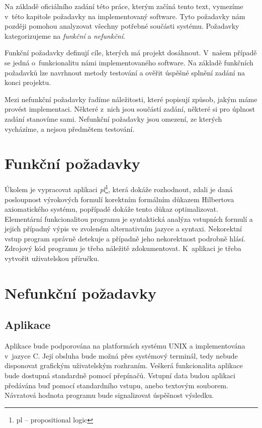 \documentclass[thesis=B,czech,hidelinks]{FITthesis}[2012/06/26]
\begin{document}
Na základě oficiálního zadání této práce, kterým začíná tento text, vymezíme v~této kapitole požadavky na implementovaný software. Tyto požadavky nám později pomohou analyzovat všechny potřebné součásti systému. Požadavky kategorizujeme na \emph{funkční} a \emph{nefunkční}.

Funkční požadavky definují cíle, kterých má projekt dosáhnout. V~našem případě se jedná o~funkcionalitu námi implementovaného software. Na základě funkčních požadavků lze navrhnout metody testování a ověřit úspěšné splnění zadání na konci projektu.

Mezi nefunkční požadavky řadíme náležitosti, které popisují způsob, jakým máme provést implementaci. Některé z~nich jsou součástí zadání, některé si pro úplnost zadání stanovíme sami. Nefunkční požadavky jsou omezení, ze kterých vycházíme, a nejsou předmětem testování.

\section{Funkční požadavky}

Úkolem je vypracovat aplikaci \emph{pl}\footnote{pl -- propositional logic}, která dokáže rozhodnout, zdali je daná posloupnost výrokových formulí korektním formálním důkazem Hilbertova axiomatického systému, popřípadě dokáže tento důkaz optimalizovat. Elementární funkcionalitou programu je syntaktická analýza vstupních formulí a jejich případný výpis ve zvoleném alternativním jazyce a syntaxi. Nekorektní vstup program správně detekuje a případně jeho nekorektnost podrobně hlásí. Zdrojový kód programu je třeba náležitě zdokumentovat. K~aplikaci je třeba vytvořit uživatelskou příručku.

\section{Nefunkční požadavky}

\subsection{Aplikace}

Aplikace bude podporována na platformách systému UNIX a implementována v~jazyce C. Její obsluha bude možná přes systémový terminál, tedy nebude disponovat grafickým uživatelským rozhraním. Veškerá funkcionalita aplikace bude dostupná standardně pomocí přepínačů. Vstupní data budou aplikaci předávána buď pomocí standardního vstupu, anebo textovým souborem. Návratová hodnota programu bude signalizovat úspěšnost výsledku.
\end{document}
